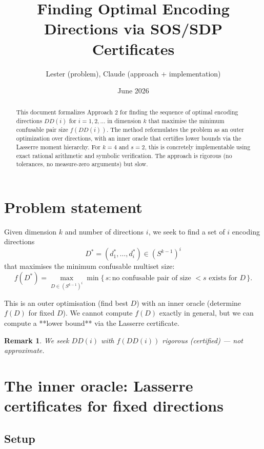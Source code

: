 \documentclass[12pt,a4paper]{article}
\title{Finding Optimal Encoding Directions via SOS/SDP Certificates}
\author{Lester (problem), Claude (approach + implementation)}
\date{June 2026}
\newtheorem{remark}{Remark}
\begin{document}
\maketitle

\begin{abstract}
This document formalizes Approach 2 for finding the sequence of optimal encoding
directions $DD(i)$ for $i = 1, 2, \ldots$ in dimension $k$ that maximise the
minimum confusable pair size $f(DD(i))$.  The method reformulates the problem as
an outer optimization over directions, with an inner oracle that certifies
lower bounds via the Lasserre moment hierarchy.  For $k=4$ and $s=2$, this is
concretely implementable using exact rational arithmetic and symbolic
verification.  The approach is rigorous (no tolerances, no measure-zero
arguments) but slow.
\end{abstract}

\tableofcontents
\newpage

\section{Problem statement}
\label{sec:problem}

Given dimension $k$ and number of directions $i$, we seek to find a set of
$i$ encoding directions
$$D^* = (d_1^*, \ldots, d_i^*) \in (S^{k-1})^i$$
that maximises the minimum confusable multiset size:
$$f(D^*) = \max_{D \in (S^{k-1})^i} \min\{\, s : \text{no confusable pair of size } < s \text{ exists for } D \,\}.$$

This is an outer optimisation (find best $D$) with an inner oracle (determine
$f(D)$ for fixed $D$).  We cannot compute $f(D)$ exactly in general, but we can
compute a **lower bound** via the Lasserre certificate.

\begin{remark}
  We seek $DD(i)$ with $f(DD(i))$ rigorous (certified) — not approximate.
\end{remark}

\section{The inner oracle: Lasserre certificates for fixed directions}
\label{sec:inner-oracle}

\subsection*{Setup}
\end{document}
